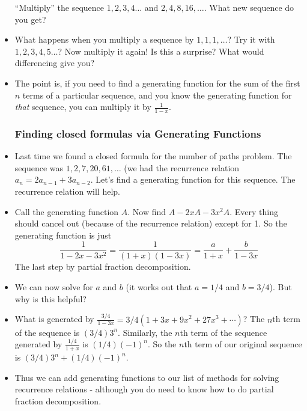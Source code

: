 \begin{itemize}
  \ex ``Multiply'' the sequence $1, 2, 3, 4 \ldots$ and $2, 4, 8, 16, \ldots$.  What new sequence do you get?
  
  \item What happens when you multiply a sequence by $1, 1, 1, \ldots$?  Try it with $1, 2, 3, 4, 5\ldots$?  Now multiply it again!  Is this a surprise?  What would differencing give you?
  
  \item The point is, if you need to find a generating function for the sum of the first $n$ terms of a particular sequence, and you know the generating function for {\em that} sequence, you can multiply it by $\frac{1}{1-x}$.
  
  \subsubsection*{Finding closed formulas via Generating Functions}
  
  \item Last time we found a closed formula for the number of paths problem.  The sequence was $1, 2, 7, 20, 61, \ldots$ (we had the recurrence relation $a_n = 2a_{n-1} + 3a_{n-2}$.  Let's find a generating function for this sequence.  The recurrence relation will help.
  
  \item Call the generating function $A$.  Now find $A - 2xA - 3x^2A$.  Every thing should cancel out (because of the recurrence relation) except for 1.  So the generating function is just 
  \[\frac{1}{1-2x -3x^2} = \frac{1}{(1+x)(1-3x)} = \frac{a}{1+x} + \frac{b}{1-3x}\]
  The last step by partial fraction decomposition.
  
  \item We can now solve for $a$ and $b$ (it works out that $a = 1/4$ and $b = 3/4$).  But why is this helpful?
  
  \item What is generated by $\frac{3/4}{1-3x} = 3/4(1 + 3x + 9x^2 + 27x^3+ \cdots)$?  The $n$th term of the sequence is $(3/4)3^n$.  Similarly, the $n$th term of the sequence generated by $\frac{1/4}{1+x}$ is $(1/4)(-1)^n$.  So the $n$th term of our original sequence is $(3/4)3^n + (1/4)(-1)^n$.
  
  \item Thus we can add generating functions to our list of methods for solving recurrence relations - although you do need to know how to do partial fraction decomposition.
\end{itemize}
